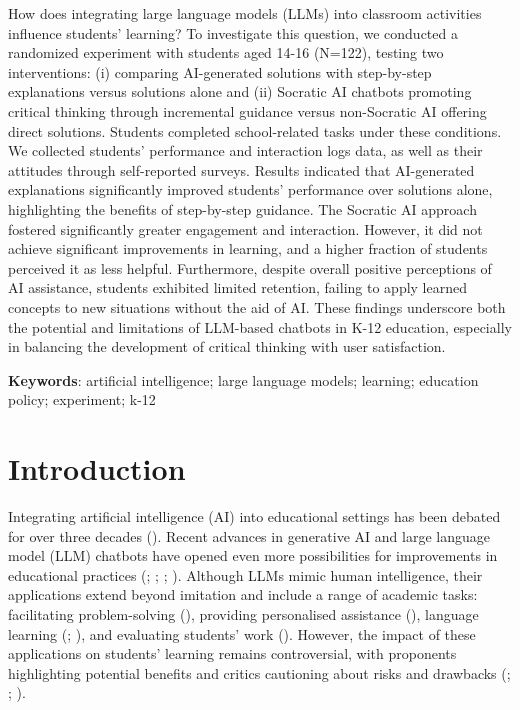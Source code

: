 \documentclass[
  12pt,
]{article}
\begin{document}
How does integrating large language models (LLMs) into classroom activities influence students' learning? To investigate this question, we conducted a randomized experiment with students aged 14-16 (N=122), testing two interventions: (i) comparing AI-generated solutions with step-by-step explanations versus solutions alone and (ii) Socratic AI chatbots promoting critical thinking through incremental guidance versus non-Socratic AI offering direct solutions. Students completed school-related tasks under these conditions. We collected students' performance and interaction logs data, as well as their attitudes through self-reported surveys. Results indicated that AI-generated explanations significantly improved students' performance over solutions alone, highlighting the benefits of step-by-step guidance. The Socratic AI approach fostered significantly greater engagement and interaction. However, it did not achieve significant improvements in learning, and a higher fraction of students perceived it as less helpful. Furthermore, despite overall positive perceptions of AI assistance, students exhibited limited retention, failing to apply learned concepts to new situations without the aid of AI. These findings underscore both the potential and limitations of LLM-based chatbots in K-12 education, especially in balancing the development of critical thinking with user satisfaction.

\textbf{Keywords}: artificial intelligence; large language models; learning; education policy; experiment; k-12

\section{Introduction}\label{introduction}

Integrating artificial intelligence (AI) into educational settings has been debated for over three decades (). Recent advances in generative AI and large language model (LLM) chatbots have opened even more possibilities for improvements in educational practices (; ; ; ). Although LLMs mimic human intelligence, their applications extend beyond imitation and include a range of academic tasks: facilitating problem-solving (), providing personalised assistance (), language learning (; ), and evaluating students' work (). However, the impact of these applications on students' learning remains controversial, with proponents highlighting potential benefits and critics cautioning about risks and drawbacks (; ; ).
\end{document}
